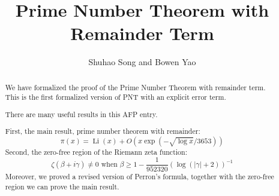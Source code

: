 \documentclass[12pt,a4paper]{article}
\begin{document}
\title{Prime Number Theorem with Remainder Term}
\author{Shuhao Song and Bowen Yao}
\maketitle

\begin{abstract}
We have formalized the proof of the Prime Number Theorem with remainder term. This is the first formalized version of PNT with an explicit error term.

There are many useful results in this AFP entry.

First, the main result, prime number theorem with remainder:
\[\pi(x) = \operatorname{Li}(x) + O\left(x \exp\left( -\sqrt{\log x}/3653 \right)\right)\]
Second, the zero-free region of the Riemann zeta function:
\[\zeta(\beta + i\gamma) \neq 0 \text{ when } \beta \ge 1 - \frac{1}{952320}\left(\log (|\gamma| + 2)\right)^{-1}\]
Moreover, we proved a revised version of Perron's formula, together with the zero-free region we can prove the main result.
\end{abstract}

\tableofcontents


\end{document}
